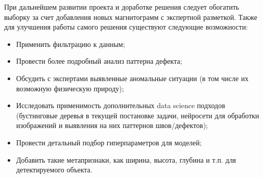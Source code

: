 \documentclass[a4paper,article,14pt]{extarticle}
\begin{document}
При дальнейшем развитии проекта и доработке решения следует обогатить выборку за счет добавления новых магнитограмм 
с экспертной разметкой. Также для улучшения работы самого решения существуют следующие возможности:

\begin{itemize}
    \item Применить фильтрацию к данным;
    \item Провести более подробный анализ паттерна дефекта;
    \item Обсудить с экспертами выявленные аномальные ситуации (в том числе их возможную физическую природу);
    \item Исследовать применимость дополнительных data science подходов (бустинговые деревья в текущей постановке задачи, нейросети для обработки изображений и выявления на них паттернов швов/дефектов);
    \item Провести детальный подбор гиперпараметров для моделей;
    \item Добавить такие метапризнаки, как ширина, высота, глубина и т.п. для детектируемого объекта.
\end{itemize}
\pagebreak
\end{document}
